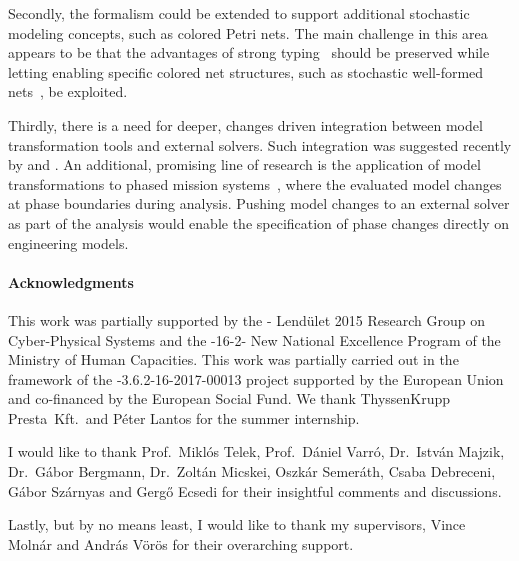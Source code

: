 Secondly, the  formalism could be extended to support additional stochastic modeling concepts, such as colored Petri nets. The main challenge in this area appears to be that the advantages of strong typing~\citep{Kindler07modular} should be preserved while letting enabling specific colored net structures, such as stochastic well-formed nets~\citep{Chiola93swn}, be exploited.

Thirdly, there is a need for deeper, changes driven integration between model transformation tools and external solvers. Such integration was suggested recently by \citet{Molnar16componentwise} and \citet[Section~2.8]{Meyers16thesis}. An additional, promising line of research is the application of model transformations to phased mission systems~\citep{Mura01pms}, where the evaluated model changes at phase boundaries during analysis. Pushing model changes to an external solver as part of the analysis would enable the specification of phase changes directly on engineering models.

\paragraph*{Acknowledgments}
{}

This work was partially supported by the - Lendület 2015 Research Group on Cyber-Physical Systems and the -16-2- New National Excellence Program of the Ministry of Human Capacities. This work was partially carried out in the framework of the -3.6.2-16-2017-00013 project supported by the European Union and co-financed by the European Social Fund. We thank ThyssenKrupp Presta~Kft.\ and Péter Lantos for the summer internship.

I would like to thank Prof.~Miklós Telek, Prof.~Dániel Varró, Dr.~István Majzik, Dr.~Gábor Bergmann, Dr.~Zoltán Micskei, Oszkár Semeráth, Csaba Debreceni, Gábor Szárnyas and Gergő Ecsedi for their insightful comments and discussions.

Lastly, but by no means least, I would like to thank my supervisors, Vince Molnár and András Vörös for their overarching support.